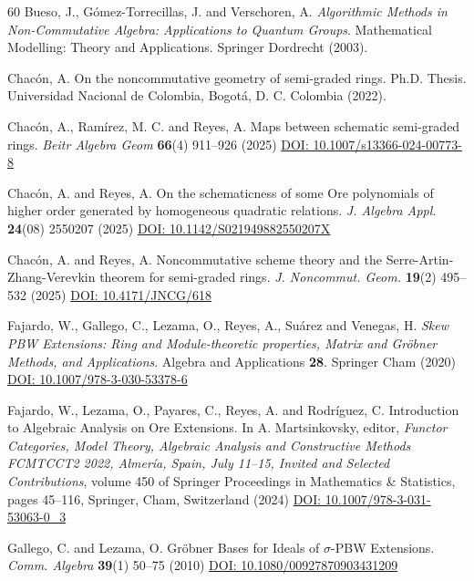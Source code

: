 \documentclass[reqno]{amsart}
\theoremstyle{definition}
\theoremstyle{remark}
\numberwithin{equation}{section}
\begin{document}
\begin{thebibliography}{60}
 Bueso, J., G\'omez-Torrecillas, J. and Verschoren, A. {\em Algorithmic Methods in Non-Commutative Algebra: Applications to Quantum Groups}. Mathematical Modelling: Theory and Applications. Springer Dordrecht (2003).

 Chac\'on, A. On the noncommutative geometry of semi-graded rings. Ph.D. Thesis. Universidad Nacional de Colombia, Bogot\'a, D. C. Colombia (2022).

 Chac\'on, A., Ram\'irez, M. C. and Reyes, A. Maps between schematic semi-graded rings. {\em Beitr Algebra Geom} {\bf 66}(4) 911--926 (2025) \href{https://doi.org/10.1007/s13366-024-00773-8}{DOI: 10.1007/s13366-024-00773-8}

 Chac\'on, A. and Reyes, A. On the schematicness of some {O}re polynomials of higher order generated by homogeneous quadratic relations. {\em J. Algebra Appl.} {\bf 24}(08) 2550207 (2025) \linebreak \href{https://doi.org/10.1142/S021949882550207X}{DOI: 10.1142/S021949882550207X}

 Chac\'on, A. and Reyes, A. Noncommutative scheme theory and the Serre-Artin-Zhang-Verevkin theorem for semi-graded rings. {\em J. Noncommut. Geom.} {\bf 19}(2) 495--532 (2025) \linebreak \href{https://doi.org/10.4171/JNCG/618}{DOI: 10.4171/JNCG/618}

 Fajardo, W., Gallego, C., Lezama, O., Reyes, A., Su\'arez and Venegas, H. {\em Skew PBW Extensions: Ring and Module-theoretic properties, Matrix and Gr\"obner Methods, and Applications}. Algebra and Applications {\bf 28}. Springer Cham (2020) \href{https://doi.org/10.1007/978-3-030-53378-6}{DOI: 10.1007/978-3-030-53378-6}

 Fajardo, W., Lezama, O., Payares, C., Reyes, A. and Rodr\'iguez, C. Introduction to Algebraic Analysis on Ore Extensions. In A. Martsinkovsky, editor, {\em Functor Categories, Model Theory, Algebraic Analysis and Constructive Methods FCMTCCT2 2022, Almer\'ia, Spain, July 11--15, Invited and Selected Contributions}, volume 450 of Springer Proceedings in Mathematics \& Statistics, pages 45--116, Springer, Cham, Switzerland (2024) \href{https://doi.org/10.1007/978-3-031-53063-0_3}{DOI: 10.1007/978-3-031-53063-0\_3}

 Gallego, C. and Lezama, O. Gr{\"o}bner {B}ases for {I}deals of $\sigma$-{P}{B}{W} {E}xtensions. {\em Comm. Algebra} {\bf 39}(1) 50--75 (2010) \href{https://doi.org/10.1080/00927870903431209}{DOI: 10.1080/00927870903431209}


\end{thebibliography}
\end{document}
